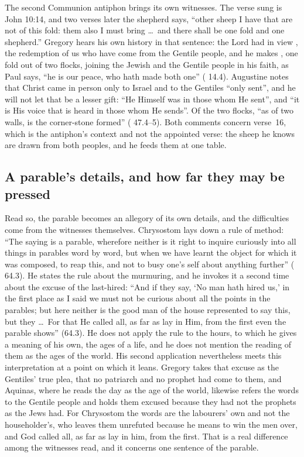 The second Communion antiphon brings its own witnesses. The verse sung is
John 10:14, and two verses later the shepherd says, ``other sheep I have that
are not of this fold: them also I must bring \ldots\ and there shall be one
fold and one shepherd.'' Gregory hears his own history in that sentence: the
Lord had in view ,
the redemption of us who have come from the Gentile people, and he makes
, one fold out of two flocks, joining the
Jewish and the Gentile people in his faith, as Paul says, ``he is our peace,
who hath made both one'' ( 14.4). Augustine notes
that Christ came in person only to Israel and to the Gentiles ``only sent'',
and he will not let that be a lesser gift: ``He Himself was in those whom He
sent'', and ``it is His voice that is heard in those whom He sends''. Of the
two flocks, ``as of two walls, is the corner-stone formed'' (
47.4--5). Both comments concern verse~16, which is the antiphon's context and
not the appointed verse: the sheep he knows are drawn from both peoples, and
he feeds them at one table.

\subsection{A parable's details, and how far they may be pressed}

Read so, the parable becomes an allegory of its own details, and the
difficulties come from the witnesses themselves. Chrysostom lays down a rule
of method: ``The saying is a parable, wherefore neither is it right to inquire
curiously into all things in parables word by word, but when we have learnt
the object for which it was composed, to reap this, and not to busy one's self
about anything further'' ( 64.3). He states the rule
about the murmuring, and he invokes it a second time about the excuse of the
last-hired: ``And if they say, `No man hath hired us,' in the first place as I
said we must not be curious about all the points in the parables; but here
neither is the good man of the house represented to say this, but they \ldots\
For that He called all, as far as lay in Him, from the first even the parable
shows'' (64.3). He does not apply the rule to the hours, to which he gives a
meaning of his own, the ages of a life, and he does not mention the reading of
them as the ages of the world. His second application nevertheless meets this
interpretation at a point on which it leans. Gregory takes that excuse as the
Gentiles' true plea, that no patriarch and no prophet had come to them, and
Aquinas, where he reads the day as the age of the world, likewise refers the
words to the Gentile people and holds them excused because they had not the
prophets as the Jews had. For Chrysostom the words are the labourers' own and
not the householder's, who leaves them unrefuted because he means to win the
men over, and God called all, as far as lay in him, from the first. That is a
real difference among the witnesses read, and it concerns one sentence of the
parable.

